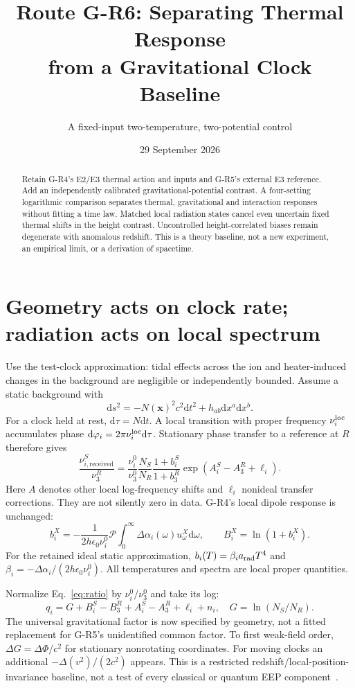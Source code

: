 \documentclass[11pt,a4paper]{article}
\title{Route G-R6: Separating Thermal Response\\from a Gravitational Clock Baseline}
\author{A fixed-input two-temperature, two-potential control}
\date{29 September 2026}
\newcommand{\dd}{\mathrm d}
\begin{document}
\maketitle
\begin{abstract}
Retain G-R4's E2/E3 thermal action and inputs and G-R5's external E3
reference. Add an independently calibrated gravitational-potential
contrast. A four-setting logarithmic comparison separates thermal,
gravitational and interaction responses without fitting a time law.
Matched local radiation states cancel even uncertain fixed thermal
shifts in the height contrast. Uncontrolled height-correlated biases
remain degenerate with anomalous redshift. This is a theory baseline,
not a new experiment, an empirical limit, or a derivation of spacetime.
\end{abstract}

\section{Geometry acts on clock rate; radiation acts on local spectrum}
Use the test-clock approximation: tidal effects across the ion and
heater-induced changes in the background are negligible or independently
bounded. Assume a static background with
\begin{equation}
 \dd s^2=-N(\mathbf x)^2c^2\dd t^2+h_{ab}\dd x^a\dd x^b .
\end{equation}
For a clock held at rest, $\dd\tau=N\dd t$. A local transition with
proper frequency $\nu_i^{\rm loc}$ accumulates phase
$\dd\varphi_i=2\pi\nu_i^{\rm loc}\dd\tau$. Stationary phase transfer
to a reference at $R$ therefore gives
\begin{equation}\label{eq:ratio}
 \frac{\nu_{i,\mathrm{received}}^S}{\nu_3^R}
 =\frac{\nu_i^0}{\nu_3^0}\frac{N_S}{N_R}
   \frac{1+b_i^S}{1+b_3^R}\exp(A_i^S-A_3^R+\ell_i).
\end{equation}
Here $A$ denotes other local log-frequency shifts and $\ell_i$
nonideal transfer corrections. They are not silently zero in data.
G-R4's local dipole response is unchanged:
\begin{equation}
 b_i^X=-\frac{1}{2h\epsilon_0\nu_i^0}\mathcal P
 \int_0^\infty\Delta\alpha_i(\omega)u_\omega^X\dd\omega,
 \qquad B_i^X=\ln(1+b_i^X).
\end{equation}
For the retained ideal static approximation,
$b_i(T)=\beta_i a_{\rm rad}T^4$ and
$\beta_i=-\Delta\alpha_i/(2h\epsilon_0\nu_i^0)$.
All temperatures and spectra are local proper quantities.

Normalize Eq.~\eqref{eq:ratio} by $\nu_i^0/\nu_3^0$ and take its log:
\begin{equation}\label{eq:q}
 q_i=G+B_i^S-B_3^R+A_i^S-A_3^R+\ell_i+n_i,\quad
 G=\ln(N_S/N_R).
\end{equation}
The universal gravitational factor is now specified by geometry,
not a fitted replacement for G-R5's unidentified common factor.
To first weak-field order,
$\Delta G=\Delta\Phi/c^2$ for stationary nonrotating coordinates.
For moving clocks an additional $-\Delta(v^2)/(2c^2)$ appears.
This is a restricted redshift/local-position-invariance baseline,
not a test of every classical or quantum EEP component~\cite{zych}.
\end{document}
